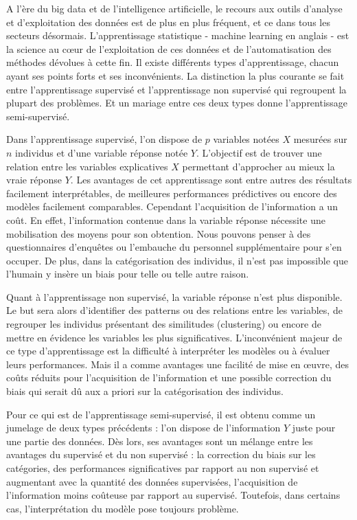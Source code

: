 \documentclass[12pt,a4paper]{book}
\newcommand{\1}{\mathds{1}}
\begin{document}
A l'ère du big data et de l'intelligence artificielle, le recours aux outils d'analyse et d'exploitation des données est de plus en plus fréquent, et ce dans tous les secteurs désormais. L'apprentissage statistique - machine learning en anglais - est la science au cœur de l'exploitation de ces données et de l'automatisation des méthodes dévolues à cette fin. Il existe différents types d'apprentissage, chacun ayant ses points forts et ses inconvénients. La distinction la plus courante se fait entre l'apprentissage supervisé et l'apprentissage non supervisé qui regroupent la plupart des problèmes. Et un mariage entre ces deux types donne l'apprentissage semi-supervisé. 

Dans l'apprentissage supervisé, l'on dispose de $p$ variables notées $X$ mesurées sur $n$ individus et d'une variable réponse notée $Y$. L'objectif est de trouver une relation entre les variables explicatives $X$ permettant d'approcher au mieux la vraie réponse $Y$. Les avantages de cet apprentissage sont entre autres des résultats facilement interprétables, de meilleures performances prédictives ou encore des modèles facilement comparables. Cependant l'acquisition de l'information a un coût. En effet, l'information contenue dans la variable réponse nécessite une mobilisation des moyens pour son obtention. Nous pouvons penser à des questionnaires d'enquêtes ou l'embauche du personnel supplémentaire pour s'en occuper. De plus, dans la catégorisation des individus, il n'est pas impossible que l'humain y insère un biais pour telle ou telle autre raison.

Quant à l'apprentissage non supervisé, la variable réponse n'est plus disponible. Le but sera alors d'identifier des patterns ou des relations entre les variables, de regrouper les individus présentant des similitudes (clustering) ou encore de mettre en évidence les variables les plus significatives. L'inconvénient majeur de ce type d'apprentissage est la difficulté à interpréter les modèles ou à évaluer leurs performances.  Mais il a comme avantages une facilité de mise en œuvre, des coûts réduits pour l'acquisition de l'information et une possible correction du biais qui serait dû aux a priori sur la catégorisation des individus.

Pour ce qui est de l'apprentissage semi-supervisé, il est obtenu comme un jumelage de deux types précédents : l'on dispose de l'information $Y$ juste pour une partie des données. Dès lors, ses avantages sont un mélange entre les avantages du supervisé et du non supervisé : la correction du biais sur les catégories, des performances significatives par rapport au non supervisé et augmentant avec la quantité des données supervisées, l'acquisition de l'information moins coûteuse par rapport au supervisé. Toutefois, dans certains cas, l'interprétation du modèle pose toujours problème.
\end{document}
